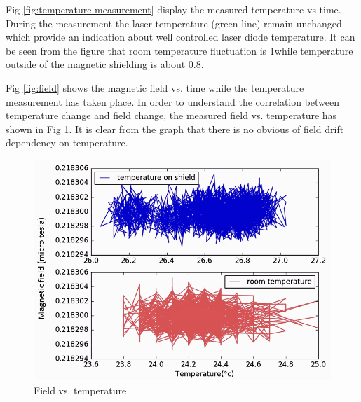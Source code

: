  Fig \ref{fig:temperature measurement} display the measured temperature vs time.  During the measurement the laser temperature (green line) remain  unchanged which provide an indication about well controlled laser diode temperature.  It can be seen from the figure that room temperature fluctuation is 1\degree while temperature outside of the magnetic shielding is about 0.8\degree. 
 
 Fig \ref{fig:field} shows the magnetic field vs. time while the temperature measurement has taken place. In order to understand the correlation between temperature change and field change, the measured field vs. temperature has shown in Fig \ref{fig:field_vs_temp}. It is clear from the graph that there is no obvious of field drift dependency on temperature.
  
 \begin{figure}[h]
\centering\includegraphics[width=0.6\linewidth]{figures/field_vs_temp.png}
\caption{Field vs. temperature\label{fig:field_vs_temp}}
\end{figure}
